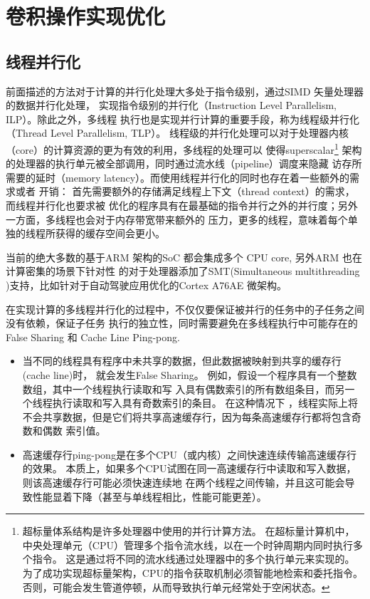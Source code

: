 
\chapter{卷积操作实现优化}
\label{cha:chapter04}

\section{线程并行化}
前面描述的方法对于计算的并行化处理大多处于指令级别，通过SIMD 矢量处理器的数据并行化处理，
实现指令级别的并行化（Instruction Level Parallelism, ILP）。除此之外，多线程
执行也是实现并行计算的重要手段，称为线程级并行化（Thread Level Parallelism, TLP）。
线程级的并行化处理可以对于处理器内核（core）的计算资源的更为有效的利用，多线程的处理可以
使得superscalar\footnote{超标量体系结构是许多处理器中使用的并行计算方法。 在超标量计算机中，中央处理单元（CPU）管理多个指令流水线，以在一个时钟周期内同时执行多个指令。 这是通过将不同的流水线通过处理器中的多个执行单元来实现的。 为了成功实现超标量架构，CPU的指令获取机制必须智能地检索和委托指令。 否则，可能会发生管道停顿，从而导致执行单元经常处于空闲状态。
} 架构的处理器的执行单元被全部调用，同时通过流水线（pipeline）调度来隐藏
访存所需要的延时（memory latency）。而使用线程并行化的同时也存在着一些额外的需求或者
开销： 首先需要额外的存储满足线程上下文（thread context）的需求，而线程并行化也要求被
优化的程序具有在最基础的指令并行之外的并行度；另外一方面，多线程也会对于内存带宽带来额外的
压力，更多的线程，意味着每个单独的线程所获得的缓存空间会更小。

当前的绝大多数的基于ARM 架构的SoC 都会集成多个 CPU core, 另外ARM 也在计算密集的场景下针对性
的对于处理器添加了SMT(Simultaneous multithreading )支持，比如针对于自动驾驶应用优化的Cortex 
A76AE 微架构。

在实现计算的多线程并行化的过程中，不仅仅要保证被并行的任务中的子任务之间没有依赖，保证子任务
执行的独立性，同时需要避免在多线程执行中可能存在的 False Sharing 和 Cache Line Ping-pong.

\begin{itemize}
  \item 当不同的线程具有程序中未共享的数据，但此数据被映射到共享的缓存行(cache line)时，
  就会发生False Sharing。 例如，假设一个程序具有一个整数数组，其中一个线程执行读取和写
  入具有偶数索引的所有数组条目，而另一个线程执行读取和写入具有奇数索引的条目。 在这种情况下
  ，线程实际上将不会共享数据，但是它们将共享高速缓存行，因为每条高速缓存行都将包含奇数和偶数
  索引值。
  \item 高速缓存行ping-pong是在多个CPU（或内核）之间快速连续传输高速缓存行的效果。
  本质上，如果多个CPU试图在同一高速缓存行中读取和写入数据，则该高速缓存行可能必须快速连续地
  在两个线程之间传输，并且这可能会导致性能显着下降（甚至与单线程相比，性能可能更差）。
\end{itemize}

